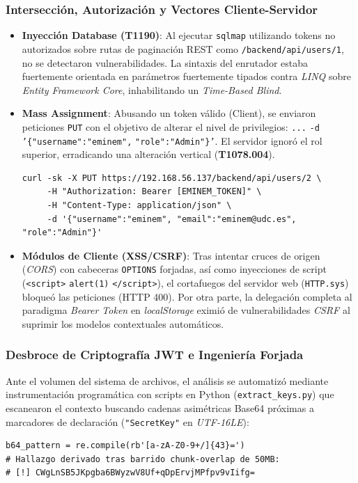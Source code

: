 \subsubsection{Intersección, Autorización y Vectores Cliente-Servidor}
\begin{itemize}
    \item \textbf{Inyección Database (T1190)}: Al ejecutar \texttt{sqlmap} utilizando tokens no autorizados sobre rutas de paginación REST como \texttt{/backend/}\allowbreak\texttt{api/}\allowbreak\texttt{users/1}, no se detectaron vulnerabilidades. La sintaxis del enrutador estaba fuertemente orientada en parámetros fuertemente tipados contra \textit{LINQ} sobre \textit{Entity Framework Core}, inhabilitando un \textit{Time-Based Blind}.
    \item \textbf{Mass Assignment}: Abusando un token válido (Client), se enviaron peticiones \texttt{PUT} con el objetivo de alterar el nivel de privilegios: \newline \texttt{...} \texttt{-d} \texttt{'\{"username":}\allowbreak\texttt{"eminem",} \texttt{"role":}\allowbreak\texttt{"Admin"\}'}. El servidor ignoró el rol superior, erradicando una alteración vertical (\textbf{T1078.004}).

\begin{lstlisting}
curl -sk -X PUT https://192.168.56.137/backend/api/users/2 \
     -H "Authorization: Bearer [EMINEM_TOKEN]" \
     -H "Content-Type: application/json" \
     -d '{"username":"eminem", "email":"eminem@udc.es", "role":"Admin"}'
\end{lstlisting}
    \item \textbf{Módulos de Cliente (XSS/CSRF)}: Tras intentar cruces de origen (\textit{CORS}) con cabeceras \texttt{OPTIONS} forjadas, así como inyecciones de script (\texttt{<script>} \texttt{alert(1)} \texttt{</script>}), el cortafuegos del servidor web (\texttt{HTTP.sys}) bloqueó las peticiones (HTTP 400). Por otra parte, la delegación completa al paradigma \textit{Bearer Token} en \textit{localStorage} eximió de vulnerabilidades \textit{CSRF} al suprimir los modelos contextuales automáticos.
\end{itemize}

\subsubsection{Desbroce de Criptografía JWT e Ingeniería Forjada}
Ante el volumen del sistema de archivos, el análisis se automatizó mediante instrumentación programática con scripts en Python (\texttt{extract\_keys.py}) que escanearon el contexto buscando cadenas asimétricas Base64 próximas a marcadores de declaración (\texttt{"Secret}\allowbreak\texttt{Key"} en \textit{UTF-16LE}):
\begin{lstlisting}
b64_pattern = re.compile(rb'[a-zA-Z0-9+/]{43}=')
# Hallazgo derivado tras barrido chunk-overlap de 50MB:
# [!] CWgLnSB5JKpgba6BWyzwV8Uf+qDpErvjMPfpv9vIifg=
\end{lstlisting}

